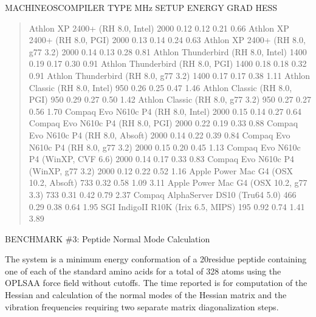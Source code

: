 \documentclass[letterpaper,11pt,english]{sphinxmanual}
\begin{document}
MACHINE\sphinxhyphen{}OS\sphinxhyphen{}COMPILER TYPE        MHz     SETUP   ENERGY  GRAD    HESS
\begin{quote}

Athlon XP 2400+ (RH 8.0, Intel)        2000    0.12    0.12    0.21    0.66
Athlon XP 2400+ (RH 8.0, PGI)  2000    0.13    0.14    0.24    0.63
Athlon XP 2400+ (RH 8.0, g77 3.2)      2000    0.14    0.13    0.28    0.81
Athlon Thunderbird (RH 8.0, Intel)     1400    0.19    0.17    0.30    0.91
Athlon Thunderbird (RH 8.0, PGI)       1400    0.18    0.18    0.32    0.91
Athlon Thunderbird (RH 8.0, g77 3.2)   1400    0.17    0.17    0.38    1.11
Athlon Classic (RH 8.0, Intel) 950     0.26    0.25    0.47    1.46
Athlon Classic (RH 8.0, PGI)   950     0.29    0.27    0.50    1.42
Athlon Classic (RH 8.0, g77 3.2)       950     0.27    0.27    0.56    1.70
Compaq Evo N610c P4 (RH 8.0, Intel)    2000    0.15    0.14    0.27    0.64
Compaq Evo N610c P4 (RH 8.0, PGI)      2000    0.22    0.19    0.33    0.88
Compaq Evo N610c P4 (RH 8.0, Absoft)   2000    0.14    0.22    0.39    0.84
Compaq Evo N610c P4 (RH 8.0, g77 3.2)  2000    0.15    0.20    0.45    1.13
Compaq Evo N610c P4 (WinXP, CVF 6.6)   2000    0.14    0.17    0.33    0.83
Compaq Evo N610c P4 (WinXP, g77 3.2)   2000    0.12    0.22    0.52    1.16
Apple Power Mac G4 (OSX 10.2, Absoft)  733     0.32    0.58    1.09    3.11
Apple Power Mac G4 (OSX 10.2, g77 3.3) 733     0.31    0.42    0.79    2.37
Compaq AlphaServer DS10 (Tru64 5.0)    466     0.29    0.38    0.64    1.95
SGI IndigoII R10K (Irix 6.5, MIPS)     195     0.92    0.74    1.41    3.89
\end{quote}

BENCHMARK \#3:  Peptide Normal Mode Calculation

The system is a minimum energy conformation of a 20\sphinxhyphen{}residue peptide containing one of each of the standard amino acids for a total of 328 atoms using the OPLS\sphinxhyphen{}AA force field without cutoffs. The time reported is for computation of the Hessian and calculation of the normal modes of the Hessian matrix and the vibration frequencies requiring two separate matrix diagonalization steps.
\end{document}
